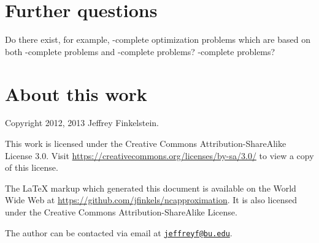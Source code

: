 \documentclass[]{article}
\newcommand{\email}[1]{\href{mailto:#1}{\nolinkurl{#1}}}
\begin{document}
\section{Further questions}

\begin{todo}
  Do there exist, for example, \ApxPO-complete optimization problems which are based on both \NP-complete problems and \PSPACE-complete problems?
  \STP-complete problems?
\end{todo}

\section{About this work}

Copyright 2012, 2013 Jef{}frey Finkelstein.

This work is licensed under the Creative Commons Attribution-ShareAlike License 3.0.
Visit \mbox{\url{https://creativecommons.org/licenses/by-sa/3.0/}} to view a copy of this license.

The \LaTeX{} markup which generated this document is available on the World Wide Web at \mbox{\url{https://github.com/jfinkels/ncapproximation}}.
It is also licensed under the Creative Commons Attribution-ShareAlike License.

The author can be contacted via email at \email{jeffreyf@bu.edu}.



\end{document}

